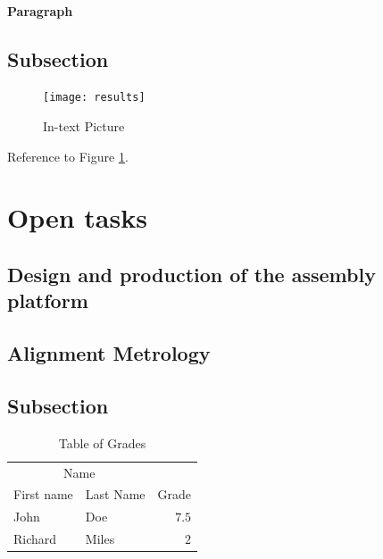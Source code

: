 \documentclass[fleqn,10pt]{SelfArx} %
\begin{document}
\paragraph{Paragraph} \lipsum[8] %

\subsection{Subsection}

\lipsum[9] %

\begin{figure}[ht]\centering
\texttt{[image: results]}
\caption{In-text Picture}
\label{fig:results}
\end{figure}

Reference to Figure \ref{fig:results}.


\section{Open tasks}

\subsection{Design and production of the assembly platform}

\subsection{}

\subsection{Alignment Metrology}

\lipsum[10] %

\subsection{Subsection}

\lipsum[11] %

\begin{table}[hbt]
\caption{Table of Grades}
\centering
\begin{tabular}{llr}
\toprule
\multicolumn{2}{c}{Name} \\
\cmidrule(r){1-2}
First name & Last Name & Grade \\
\midrule
John & Doe & $7.5$ \\
Richard & Miles & $2$ \\
\bottomrule
\end{tabular}
\label{tab:label}
\end{table}
\end{document}
